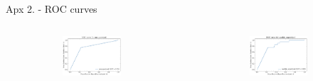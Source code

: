 \documentclass[t]{beamer}
\theoremstyle{definition}
\begin{document}

\begin{frame}{Apx 2. - ROC curves}
    \begin{columns}

    \begin{column}{0.5\textwidth}
    \begin{figure}
    \begin{subfigure}{\linewidth}
    \includegraphics[width=\linewidth]{figs/roc_auc_unsupervised.pdf}
    \end{subfigure}
    \end{figure}
    \end{column}

    \begin{column}{0.5\textwidth}
    \begin{figure}
    \begin{subfigure}{\linewidth}
    \includegraphics[width=\linewidth]{figs/roc_auc_weakly_supervised.pdf}
    \end{subfigure}
    \end{figure}
    \end{column}
    \end{columns}
\end{frame}
\end{document}

